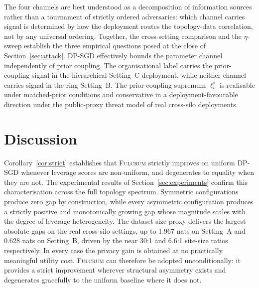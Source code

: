\documentclass[letterpaper,journal]{IEEEtran}
\newcommand{\Fulcrum}{\textsc{Fulcrum}\xspace}
\begin{document}
The four channels are best understood as a decomposition of
information sources rather than a tournament of strictly ordered
adversaries: which channel carries signal is determined by how the
deployment routes the topology-data correlation, not by any
universal ordering. Together, the cross-setting comparison and the
$\eta$-sweep establish the three empirical questions posed at the
close of Section~\ref{sec:attack}. DP-SGD effectively bounds the
parameter channel independently of prior coupling. The
organisational label carries the prior-coupling signal in the
hierarchical Setting~C deployment, while neither channel carries
signal in the ring Setting~B. The prior-coupling supremum
$\ell_i^\circ$ is realisable under matched-prior conditions and
conservative in a deployment-favourable direction under the
public-proxy threat model of real cross-silo deployments.

\section{Discussion}
\label{sec:discussion}

Corollary~\ref{cor:strict} establishes that \Fulcrum strictly
improves on uniform DP-SGD whenever leverage scores are non-uniform,
and degenerates to equality when they are not. The experimental
results of Section~\ref{sec:experiments} confirm this
characterisation across the full topology spectrum. Symmetric
configurations produce zero gap by construction, while every
asymmetric configuration produces a strictly positive and
monotonically growing gap whose magnitude scales with the degree of
leverage heterogeneity. The dataset-size proxy delivers the largest
absolute gaps on the real cross-silo settings, up to 1.967 nats on
Setting~A and 0.628 nats on Setting~B, driven by the near 30:1 and
6.6:1 site-size ratios respectively. In every case the privacy gain
is obtained at no practically meaningful utility cost. \Fulcrum can
therefore be adopted unconditionally: it provides a strict
improvement wherever structural asymmetry exists and degenerates
gracefully to the uniform baseline where it does not.
\end{document}
